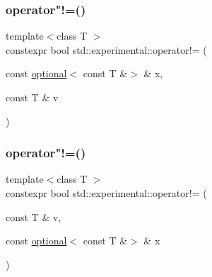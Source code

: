 \mbox{\label{namespacestd_1_1experimental_a007e24ca3b589918778709281a5611d7}} 
\subsubsection{\texorpdfstring{operator"!=()}{operator!=()}\hspace{0.1cm}{\footnotesize\ttfamily [8/9]}}
{\footnotesize\ttfamily template$<$class T $>$ \\
constexpr bool std\+::experimental\+::operator!= (\begin{DoxyParamCaption}\item[{const \hyperlink{classstd_1_1experimental_1_1optional}{optional}$<$ const T \&$>$ \&}]{x,  }\item[{const T \&}]{v }\end{DoxyParamCaption})}

\mbox{\label{namespacestd_1_1experimental_ab5a8b15ec09913c93bac27399f0cba38}} 
\subsubsection{\texorpdfstring{operator"!=()}{operator!=()}\hspace{0.1cm}{\footnotesize\ttfamily [9/9]}}
{\footnotesize\ttfamily template$<$class T $>$ \\
constexpr bool std\+::experimental\+::operator!= (\begin{DoxyParamCaption}\item[{const T \&}]{v,  }\item[{const \hyperlink{classstd_1_1experimental_1_1optional}{optional}$<$ const T \&$>$ \&}]{x }\end{DoxyParamCaption})}

\mbox{\label{namespacestd_1_1experimental_a27caacd2780817469b565c269933185d}} 

